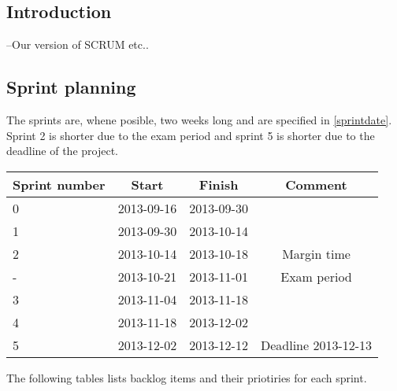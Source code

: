 

\subsection{Introduction}
--Our version of SCRUM etc..

\subsection{Sprint planning}

The sprints are, whene posible, two weeks long and are specified in \ref{sprintdate}. Sprint 2 is shorter due to the exam period and sprint 5 is shorter due to the deadline of the project.

\label{sprintdate}
\begin{center}
	\begin{Large}
	\begin{tabular}{|l|c|c|c|}
		\hline
		\large{\textbf{Sprint number}} & \large{\textbf{Start}} & \large{\textbf{Finish}} & \large{\textbf{Comment}} \\
		\hline
		\large{0} & \large{2013-09-16} & \large{2013-09-30} & \large{} \\
		\hline
		\large{1} & \large{2013-09-30} & \large{2013-10-14} & \large{} \\
		\hline
		\large{2} & \large{2013-10-14} & \large{2013-10-18} & \large{Margin time} \\
		\hline
		\large{-} & \large{2013-10-21} & \large{2013-11-01} & \large{Exam period} \\
		\hline
		\large{3} & \large{2013-11-04} & \large{2013-11-18} & \large{} \\
		\hline
		\large{4} & \large{2013-11-18} & \large{2013-12-02} & \large{} \\
		\hline	
		\large{5} & \large{2013-12-02} & \large{2013-12-12} & \large{Deadline 2013-12-13} \\
		\hline	
	\end{tabular}
	\end{Large}
\end{center}

The following tables lists backlog items and their priotiries for each sprint. \\


